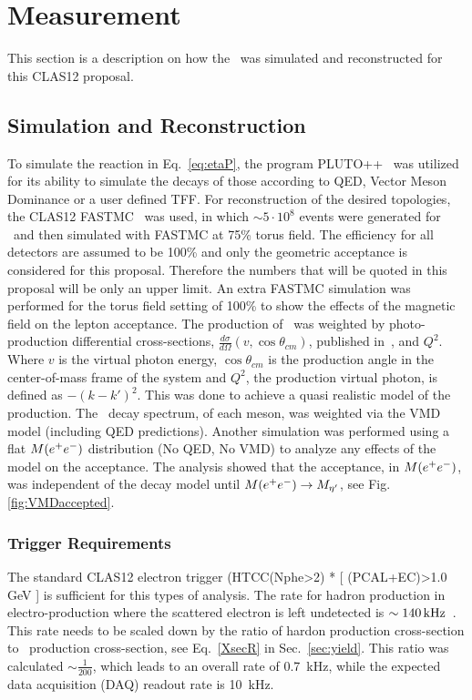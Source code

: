 \section{Measurement}\label{sec:measurement}
This section is a description on how the \etaDal \ was simulated and reconstructed for this CLAS12 proposal.
\subsection{Simulation and Reconstruction}
To simulate the reaction in Eq.~\ref{eq:etaP}, the program PLUTO++~\cite{PLUTO} was utilized for its ability to simulate the decays of those according to QED, Vector Meson Dominance or a user defined TFF. For reconstruction of the desired topologies, the CLAS12 FASTMC~\cite{fastmc} was used, in which $\sim 5\cdot10^8$ events were generated for \etaPDal \ and then simulated with FASTMC at 75\% torus field. The efficiency for all detectors are assumed to be 100\% and only the geometric acceptance is considered for this proposal. Therefore the numbers that will be quoted in this proposal will be only an upper limit. An extra FASTMC simulation was performed for the torus field setting of 100\% to show the effects of the magnetic field on the lepton acceptance. 
 \newline
\indent The production of \etaTP \ was weighted by photo-production differential cross-sections, $\frac{d\sigma}{d\Omega}(v,\cos\theta_{cm})$, published in~\cite{Williams}, and $Q^2$. Where $v$ is the virtual photon energy, $\cos\theta_{cm}$ is the production angle in the center-of-mass frame of the system and $Q^2$, the production virtual photon, is defined as $-(k-k')^2$. This was done to achieve a quasi realistic model of the production. The \epemT \  decay spectrum, of each meson, was weighted via the VMD model (including QED predictions). Another simulation was performed using a flat $M(e^+e^-)$ distribution (No QED, No VMD) to analyze any effects of the model on the \epemT acceptance. The analysis showed that the acceptance, in $M(e^+e^-)$, was independent of the decay model until $M(e^+e^-)\to M_{\eta^{\prime}} $, see Fig.\ref{fig:VMDaccepted}.
\subsubsection{Trigger Requirements}
The standard CLAS12 electron trigger (HTCC(Nphe>2) * [ (PCAL+EC)>1.0 GeV ] is sufficient for this types of analysis. The rate for hadron production in electro-production where the scattered electron is left undetected is $\sim 140\,\rm{kHz}$~\cite{Sargsyan}. This rate needs to be scaled down by the ratio of hardon production cross-section to \etaTP \ production cross-section, see Eq.~\ref{XsecR} in Sec.~\ref{sec:yield}. This ratio was calculated $\sim\frac{1}{200}$, which leads to an overall rate of 0.7~kHz, while the expected data acquisition (DAQ) readout rate is 10~kHz.
